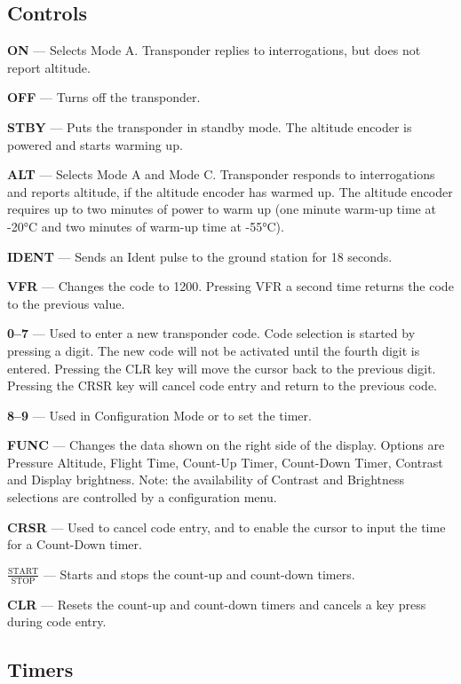 \subsection*{Controls}

\textbf{ON} --- Selects Mode A. Transponder replies to interrogations, but does not report altitude.

\textbf{OFF} --- Turns off the transponder.

\textbf{STBY} --- Puts the transponder in standby mode. The altitude encoder is powered and starts warming up.

\textbf{ALT} --- Selects Mode A and Mode C. Transponder responds to interrogations and reports altitude, if the altitude encoder has warmed up. The altitude encoder requires up to two minutes of power to warm up (one minute warm-up time at -20°C and two minutes of warm-up time at -55°C).

\textbf{IDENT} --- Sends an Ident pulse to the ground station for 18 seconds.

\textbf{VFR} --- Changes the code to 1200. Pressing VFR a second time returns the code to the previous value.

\textbf{0--7} --- Used to enter a new transponder code. Code selection is started by pressing a digit. The new code will not be activated until the fourth digit is entered. Pressing the CLR key will move the cursor back to the previous digit. Pressing the CRSR key will cancel code entry and return to the previous code.

\textbf{8--9} --- Used in Configuration Mode or to set the timer.

\textbf{FUNC} --- Changes the data shown on the right side of the display. Options are Pressure Altitude, Flight Time, Count-Up Timer, Count-Down Timer, Contrast and Display brightness. Note: the availability of Contrast and Brightness selections are controlled by a configuration menu.

\textbf{CRSR} --- Used to cancel code entry, and to enable the cursor to input the time for a Count-Down timer.

\textbf{$\mathrm{\frac{START}{STOP}}$} --- Starts and stops the count-up and count-down timers.

\textbf{CLR} --- Resets the count-up and count-down timers and cancels a key press during code entry.

\subsection*{Timers}

